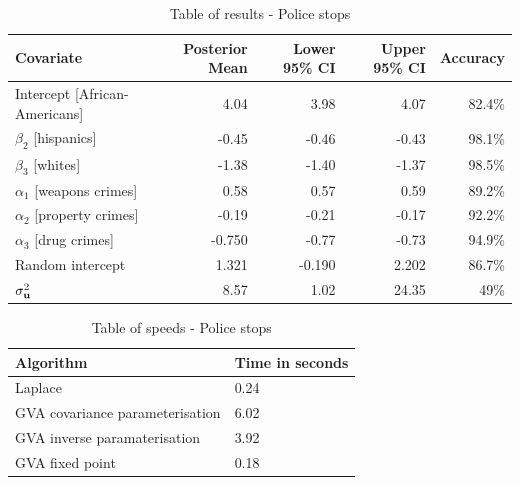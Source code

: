 			\begin{table}
				\caption{Table of results - Police stops}
				\label{tab:application_police_stops}
				\begin{tabular}{|l|rrrr|}
					\hline
					Covariate                     & Posterior Mean & Lower 95\% CI & Upper 95\% CI & Accuracy \\
					\hline
					Intercept [African-Americans] & 4.04          & 3.98           & 4.07          & 82.4\%   \\
					$\beta_2$ [hispanics]         & -0.45         & -0.46          & -0.43         & 98.1\%   \\
					$\beta_3$ [whites]            & -1.38         & -1.40          & -1.37         & 98.5\%   \\
					$\alpha_1$ [weapons crimes]   & 0.58          & 0.57           & 0.59          & 89.2\%   \\
					$\alpha_2$ [property crimes]  & -0.19         & -0.21          & -0.17         & 92.2\%   \\
					$\alpha_3$ [drug crimes]      & -0.750        & -0.77          & -0.73         & 94.9\%   \\
					Random intercept              & 1.321         & -0.190         & 2.202         & 86.7\%   \\
					$\sigma^2_{{\bf u}}$              & 8.57          & 1.02           & 24.35         & 49\%     \\
					\hline
				\end{tabular}
			\end{table}
			
			\begin{table}
				\begin{tabular}{|ll|}
					\hline
					Algorithm & Time  in seconds \\
					\hline
					Laplace & 0.24 \\
					GVA covariance parameterisation & 6.02 \\
					GVA inverse paramaterisation & 3.92 \\
					GVA fixed point & 0.18 \\
					\hline
				\end{tabular}
				\caption{Table of speeds - Police stops}
				\label{tab:police_stop_speeds}
			\end{table}
			
